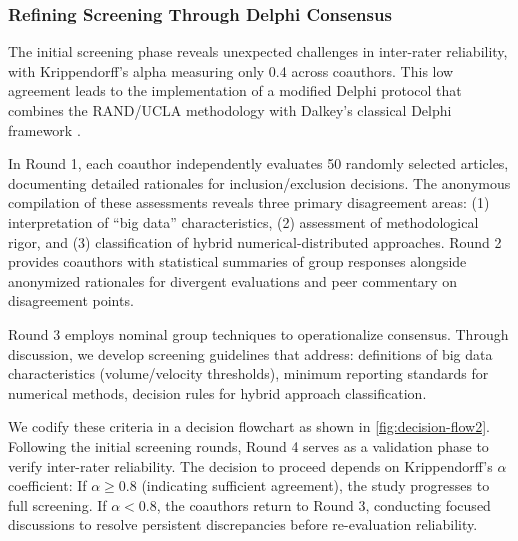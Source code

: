 \documentclass[acmsmall]{acmart}
\begin{document}

\subsubsection{Refining Screening Through Delphi Consensus}\label{subsubsec:phase-2-literature-search-and-study-selection:refining-screening-through-delphi-consensus}
The initial screening phase reveals unexpected challenges in inter-rater reliability, with Krippendorff's alpha measuring only 0.4 across coauthors. This low agreement leads to the implementation of  a modified Delphi protocol that combines the RAND/UCLA methodology \citep{fitch2001rand} with Dalkey's classical Delphi framework \citep{dalkey1969delphi}.

In Round 1, each coauthor independently evaluates 50 randomly selected articles, documenting detailed rationales for inclusion/exclusion decisions. The anonymous compilation of these assessments reveals three primary disagreement areas: (1) interpretation of ``big data'' characteristics, (2) assessment of methodological rigor, and (3) classification of hybrid numerical-distributed approaches. Round 2 provides coauthors with statistical summaries of group responses alongside anonymized rationales for divergent evaluations and peer commentary on disagreement points.

Round 3 employs nominal group techniques \citep{delbecq1971group} to operationalize consensus. Through discussion, we develop  screening guidelines that address:  definitions of big data characteristics (volume/velocity thresholds), minimum reporting standards for numerical methods, decision rules for hybrid approach classification.

We codify these criteria in a decision flowchart as shown in \cref{fig:decision-flow2}. Following the initial screening rounds, Round 4 serves as a validation phase to verify inter-rater reliability. The decision to proceed depends on Krippendorff's $\alpha$ coefficient: If $\alpha \geq 0.8$ (indicating sufficient agreement), the study progresses to full screening. If $\alpha < 0.8$, the coauthors return to Round 3, conducting focused discussions to resolve persistent discrepancies before re-evaluation reliability.
\end{document}

